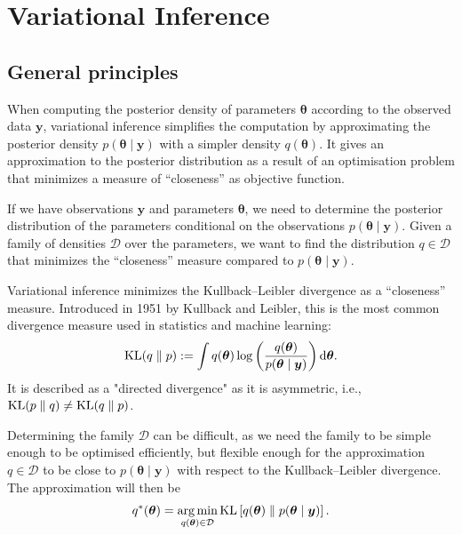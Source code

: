 \documentclass[a4paper, 11pt]{report}
\numberwithin{equation}{chapter}
\DeclareMathOperator*{\argmin}{arg\,min}
\DeclareMathOperator*{\KL}{{\rm KL}}
\begin{document}
\chapter{Variational Inference}
\section{General principles} \label{sec:gen_princ}
When computing the posterior density of parameters $\boldsymbol{\theta}$ according to the observed data $\boldsymbol{y}$, variational inference simplifies the computation by approximating the posterior density $p(\boldsymbol{\theta}\mid \boldsymbol{y})$ with a simpler density $q(\boldsymbol{\theta})$. It gives an approximation to the posterior distribution as a result of an optimisation problem that minimizes a measure of ``closeness'' as objective function.

If we have observations $\boldsymbol{y}$ and parameters $\boldsymbol{\theta}$, we need to determine the posterior distribution of the parameters conditional on the observations $p(\boldsymbol{\theta} \mid \boldsymbol{y})$. Given a family of densities $\mathcal{D}$ over the parameters, we want to find the distribution $q \in \mathcal{D}$ that minimizes the ``closeness'' measure compared to $p(\boldsymbol{\theta} \mid \boldsymbol{y})$.

Variational inference minimizes the Kullback--Leibler divergence as a ``closeness'' measure. Introduced in 1951 by Kullback and Leibler\cite{kl51}, this is the most common divergence measure used in statistics and machine learning:
\begin{equation*}
\KL(q\parallel p) := \int q(\boldsymbol{\theta})\log \left(\frac{q(\boldsymbol{\theta})}{p(\boldsymbol{\theta} \mid \boldsymbol{y})}\right) \mathrm{d}\boldsymbol{\theta}.
\end{equation*} 
It is described as a "directed divergence" as it is asymmetric, i.e., $\KL(p\parallel q) \neq \KL(q \parallel p)$.

Determining the family $\mathcal{D}$ can be difficult, as we need the family to be simple enough to be optimised efficiently, but flexible enough for the approximation $q \in \mathcal{D}$ to be close to $p(\boldsymbol{\theta} \mid \boldsymbol{y})$ with respect to the Kullback--Leibler divergence. The approximation will then be
\begin{equation*}
q^*(\boldsymbol{\theta} ) = \argmin_{q(\boldsymbol{\theta}) \in \mathcal{D}} \KL\left[ q(\boldsymbol{\theta}) \parallel p(\boldsymbol{\theta} \mid \boldsymbol{y})\right].
\end{equation*}
\end{document}

